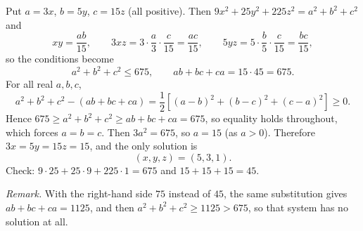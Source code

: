 Put $a=3x$, $b=5y$, $c=15z$ (all positive). Then $9x^2+25y^2+225z^2=a^2+b^2+c^2$ and
\[
xy=\dfrac{ab}{15},\qquad 3xz=3\cdot\dfrac {a}{3}\cdot\dfrac {c}{15}=\dfrac{ac}{15},\qquad 5yz=5\cdot\dfrac {b}{5}\cdot\dfrac {c}{15}=\dfrac{bc}{15},
\]
so the conditions become
\[
a^2+b^2+c^2\le675,\qquad ab+bc+ca=15\cdot45=675 .
\]
For all real $a,b,c$,
\[
a^2+b^2+c^2-(ab+bc+ca)=\dfrac{1}{2}\left[(a-b)^2+(b-c)^2+(c-a)^2\right]\ge0 .
\]
Hence $675\ge a^2+b^2+c^2\ge ab+bc+ca=675$, so equality holds throughout, which forces $a=b=c$. Then $3a^2=675$, so $a=15$ (as $a>0$). Therefore $3x=5y=15z=15$, and the only solution is
\[
\boxed{(x,y,z)=(5,3,1)} .
\]
Check: $9\cdot25+25\cdot9+225\cdot1=675$ and $15+15+15=45$.

\emph{Remark.} With the right-hand side $75$ instead of $45$, the same substitution gives $ab+bc+ca=1125$, and then $a^2+b^2+c^2\ge1125>675$, so that system has no solution at all.
